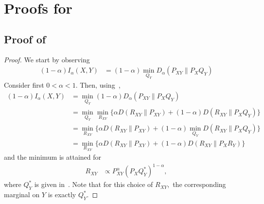 \documentclass{article}
\numberwithin{theorem}{section}
\numberwithin{example}{section}
\numberwithin{remark}{section}
\numberwithin{definition}{section}
\begin{document}
\section{Proofs for~} 

\subsection{Proof of~}\label{app:variational:Lemma-SibsonViaKL}


\begin{proof}
We start by observing
\begin{align}
   (1-\alpha)I_\alpha(X,Y) &= (1-\alpha) \min_{Q_Y} D_\alpha(P_{XY}\|P_XQ_Y)
\end{align}   
Consider first $0<\alpha<1.$ Then, using~,
\begin{align}
   (1-\alpha)I_\alpha(X,Y) &=  \min_{Q_Y} (1-\alpha) D_\alpha(P_{XY}\|P_XQ_Y) \\
   &= \min_{Q_Y} \min_{R_{XY}} \{\alpha D(R_{XY}\|P_{XY}) + (1-\alpha) D(R_{XY}\|P_XQ_Y) \}\\
   &= \min_{R_{XY}} \{\alpha D(R_{XY}\|P_{XY}) + (1-\alpha) \min_{Q_Y} D(R_{XY}\|P_XQ_Y) \} \\
   &= \min_{R_{XY}} \{\alpha D(R_{XY}\|P_{XY}) + (1-\alpha)  D(R_{XY}\|P_XR_Y) \} %
\end{align}
and the minimum is attained for
\begin{align}
 R_{XY} &\propto P_{XY}^{\alpha} (P_XQ_Y^*)^{1-\alpha}, \label{Lemma-SibsonViaKL-eq-RXYforequality}
\end{align}
where $Q_Y^*$ is given in~.
Note that for this choice of $R_{XY},$ the corresponding marginal on $Y$ is exactly $Q_Y^*.$


\end{proof}
\end{document}
